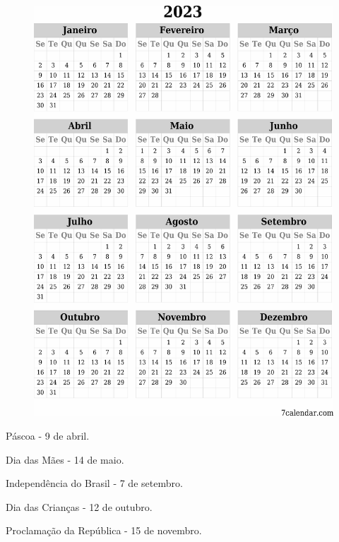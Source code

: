 \begin{figure}[htpb!]
\includegraphics[width=\textwidth]{./media/image52.png}
\end{figure}

\begin{escolha}
\item  Páscoa - 9 de abril.

\item  Dia das Mães - 14 de maio.

\item  Independência do Brasil - 7 de setembro.

\item  Dia das Crianças - 12 de outubro.

\item  Proclamação da República - 15 de novembro.
\end{escolha}

